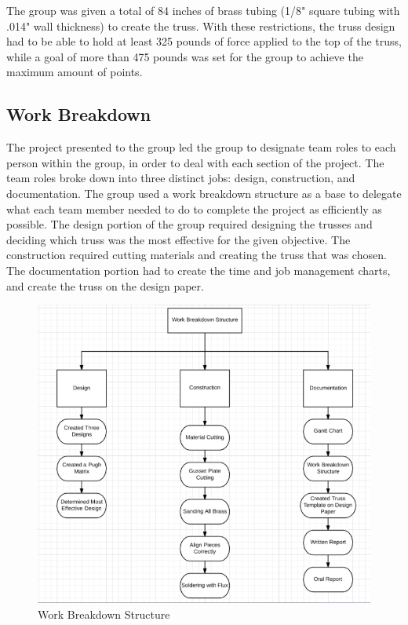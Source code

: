 \documentclass{article}
\begin{document}
The group was given a total of 84 inches of brass tubing (1/8" square tubing with .014" wall thickness) to create the truss. With these restrictions, the truss design had to be able to hold at least 325 pounds of force applied to the top of the truss, while a goal of more than 475 pounds was set for the group to achieve the maximum amount of points. 


\subsection{Work Breakdown}
The project presented to the group led the group to designate team roles to each person within the group, in order to deal with each section of the project. The team roles broke down into three distinct jobs: design, construction, and documentation. The group used a work breakdown structure as a base to delegate what each team member needed to do to complete the project as efficiently as possible. The design portion of the group required designing the trusses and deciding which truss was the most effective for the given objective. The construction required cutting materials and creating the truss that was chosen. The documentation portion had to create the time and job management charts, and create the truss on the design paper.

\newpage

\begin{figure}[ht]
\caption{Work Breakdown Structure}
\centering
\includegraphics[width=400pt]{WorkBreakdown.png}
\end{figure}
\end{document}
